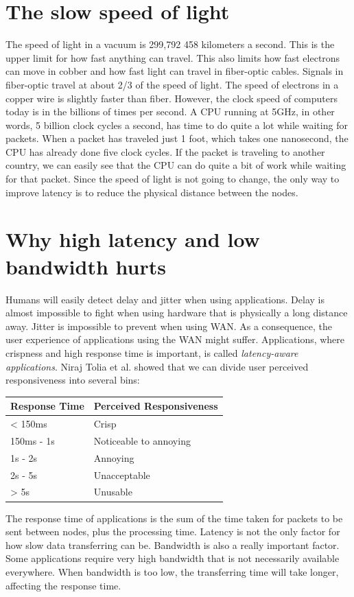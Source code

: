 \section{The slow speed of light}
The speed of light in a vacuum is 299,792 458 kilometers a second. This is the upper limit for how fast anything can travel. This also limits how fast electrons can move in cobber and how fast light can travel in fiber-optic cables. Signals in fiber-optic travel at about 2/3 of the speed of light. The speed of electrons in a copper wire is slightly faster than fiber. However, the clock speed of computers today is in the billions of times per second. A CPU running at 5GHz, in other words, 5 billion clock cycles a second, has time to do quite a lot while waiting for packets. When a packet has traveled just 1 foot, which takes one nanosecond, the CPU has already done five clock cycles. If the packet is traveling to another country, we can easily see that the CPU can do quite a bit of work while waiting for that packet. Since the speed of light is not going to change, the only way to improve latency is to reduce the physical distance between the nodes.






\section{Why high latency and low bandwidth hurts}


Humans will easily detect delay and jitter when using applications\cite{satyanarayanan_case_2009}. Delay is almost impossible to fight when using hardware that is physically a long distance away. Jitter is impossible to prevent when using WAN. As a consequence, the user experience of applications using the WAN might suffer. Applications, where crispness and high response time is important, is called \textit{latency-aware applications}. Niraj Tolia et al.\cite{tolia_quantifying_2006} showed that we can divide user perceived responsiveness into several bins:
\begin{center}
\begin{tabular}{ | p{3cm} | p{5cm} | } 
    \hline
    Response Time& Perceived Responsiveness  \\ 
    \hline
    < 150ms & Crisp  \\ 
    150ms - 1s & Noticeable to annoying \\ 
    1s - 2s & Annoying \\ 
    2s - 5s & Unacceptable \\ 
    > 5s & Unusable \\ 
    \hline
\end{tabular}
\end{center}
The response time of applications is the sum of the time taken for packets to be sent between nodes, plus the processing time. Latency is not the only factor for how slow data transferring can be. Bandwidth is also a really important factor\cite{cerqueira_interactive_2007}. Some applications require very high bandwidth that is not necessarily available everywhere. When bandwidth is too low, the transferring time will take longer, affecting the response time.


